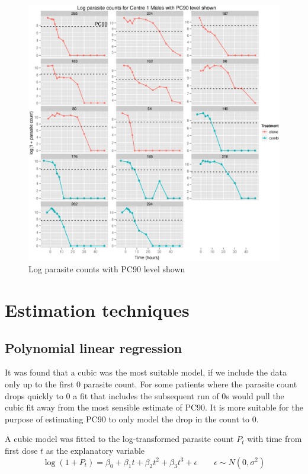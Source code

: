 \begin{figure}[p]
\begin{center}
\includegraphics[width=6.1in]{log901M.eps}
\caption{Log parasite counts with PC90 level shown}
\label{log901M}
\end{center}
\end{figure}
\section{Estimation techniques}
\subsection{Polynomial linear regression}
It was found that a cubic was the most suitable model, if we include the data only up to the first 0 parasite count. For some patients where the parasite count drops quickly to 0 a fit that includes the subsequent run of 0s would pull the cubic fit away from the most sensible estimate of PC90. It is more suitable for the purpose of estimating PC90 to only model the drop in the count to 0.

A cubic model was fitted to the log-transformed parasite count $P_{t}$ with time from first dose $t$ as the explanatory variable
$$\log(1+P_{t})=\beta_0+\beta_1t+\beta_2t^2+\beta_3t^3+\epsilon\quad\quad\epsilon\sim N(0,\sigma^2)$$

